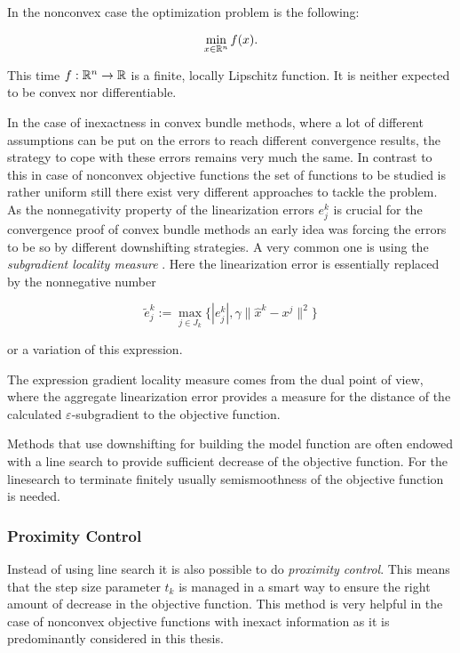 In the nonconvex case the optimization problem is the following:

\begin{equation}
	\min_{x \in \mathbb{R}^n} f(x).
\label{opt_prob_nonconv}
\end{equation}

This time \(f:\mathbb{R}^n \to \mathbb{R}\) is a finite, locally Lipschitz  function. It is neither expected to be convex nor differentiable.

In the case of inexactness in convex bundle methods, where a lot of different assumptions can be put on the errors to reach different convergence results, the strategy to cope with these errors remains very much the same. In contrast to this in case of nonconvex objective functions the set of functions to be studied is rather uniform still there exist very different approaches to tackle the problem.
As the nonnegativity property of the linearization errors \(e_j^k\) is crucial for the convergence proof of convex bundle methods an early idea was forcing the errors to be so by different downshifting strategies. A very common one is using the \emph{subgradient locality measure} \cite{Kiwiel1986, Mifflin1982}. Here the linearization error is essentially replaced by the nonnegative number

\begin{equation*}
	\tilde{e}_j^k := \max_{j \in J_k} \{|e_j^k|,\gamma \|\hat{x}^k-x^j\|^2\}
\label{subgr_loc_measure}
\end{equation*}

or a variation of this expression.

The expression gradient locality measure comes from the dual point of view, where the aggregate linearization error provides a measure for the distance of the calculated \(\varepsilon\)-subgradient to the objective function.

Methods that use downshifting for building the model function are often endowed with a line search to provide sufficient decrease of the objective function. For the linesearch to terminate finitely usually semismoothness of the objective function is needed.

\subsubsection{Proximity Control}

Instead of using line search it is also possible to do \emph{proximity control}. This means that the step size parameter \(t_k\) is managed in a smart way to ensure the right amount of decrease in the objective function. This method is very helpful in the case of nonconvex objective functions with inexact information as it is predominantly considered in this thesis.

